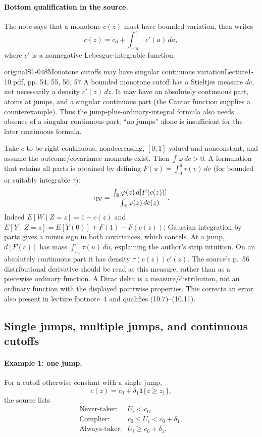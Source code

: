 \paragraph{Bottom qualification in the source.}
The note says that a monotone $c(z)$ must have bounded variation, then writes
\[
 c(z)=c_0+\int_{-\infty}^zc'(a)\,da,
\]
where $c'$ is a nonnegative Lebesgue-integrable function.
\begin{reviewnote}{original}{S1-048}{Monotone cutoffs may have singular continuous variation}{Lecture1-10.pdf, pp. 54, 55, 56, 57}
A bounded monotone cutoff has a Stieltjes measure $dc$, not necessarily a density $c'(z)\,dz$. It may have an absolutely continuous part, atoms at jumps, and a singular continuous part (the Cantor function supplies a counterexample). Thus the jump-plus-ordinary-integral formula also needs absence of a singular continuous part; ``no jumps'' alone is insufficient for the later continuous formula.

Take $c$ to be right-continuous, nondecreasing, $[0,1]$-valued and nonconstant, and assume the outcome/covariance moments exist. Then $\int\varphi\,dc>0$. A formulation that retains all parts is obtained by defining $F(u)=\int_0^u\tau(v)\,dv$ (for bounded or suitably integrable $\tau$):
\[
\tau_{\rm IV}=\frac{\int_{\mathbb R}\varphi(z)\,d[F(c(z))]}{\int_{\mathbb R}\varphi(z)\,dc(z)}.
\]
Indeed $E[W\mid Z=z]=1-c(z)$ and $E[Y\mid Z=z]=E[Y(0)]+F(1)-F(c(z))$; Gaussian integration by parts gives a minus sign in both covariances, which cancels. At a jump, $d[F(c)]$ has mass $\int_{c_-}^{c}\tau(u)\,du$, explaining the author's strip intuition. On an absolutely continuous part it has density $\tau(c(z))c'(z)$. The source's p.~56 distributional derivative should be read as this measure, rather than as a piecewise ordinary function. A Dirac delta is a measure/distribution, not an ordinary function with the displayed pointwise properties. This corrects an error also present in lecture footnote~4 and qualifies (10.7)--(10.11).
\end{reviewnote}



\clearpage
\subsection{Single jumps, multiple jumps, and continuous cutoffs}
\paragraph{Example 1: one jump.}
For a cutoff otherwise constant with a single jump,
\[
 c(z)=c_0+\delta_1\mathbf1\{z\ge z_1\},
\]
the source lists
\[
 \begin{array}{ll}
 \text{Never-taker:}&U_i<c_0,\\
 \text{Complier:}&c_0\le U_i<c_0+\delta_1,\\
 \text{Always-taker:}&U_i\ge c_0+\delta_1.
 \end{array}
\]


